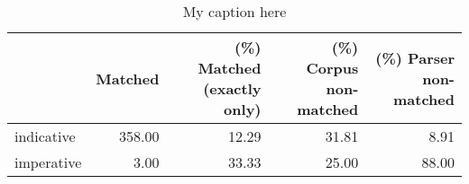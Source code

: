 \begin{table}[!ht]
\centering
\begin{tabular}{lrrrr}
\toprule
{} &  Matched &  (\%) Matched (exactly only) &  (\%) Corpus non-matched &  (\%) Parser non-matched \\
\midrule
indicative &   358.00 &                       12.29 &                   31.81 &                    8.91 \\
imperative &     3.00 &                       33.33 &                   25.00 &                   88.00 \\
\bottomrule
\end{tabular}
\caption{My caption here}
\label{tab:MOOD-ocd-relative}
\end{table}